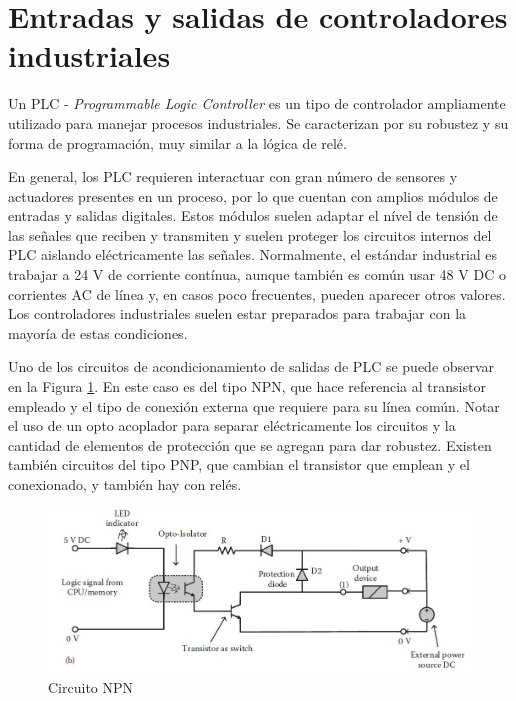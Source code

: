 \section{Entradas y salidas de controladores industriales}

Un PLC - \textit{Programmable Logic Controller} es un tipo de controlador ampliamente utilizado para manejar procesos industriales. Se caracterizan por su robustez y su forma de programación, muy similar a la lógica de relé.

En general, los PLC requieren interactuar con gran número de sensores y actuadores presentes en un proceso, por lo que cuentan con amplios módulos de entradas y salidas digitales. Estos módulos suelen adaptar el nível de tensión de las señales que reciben y transmiten y suelen proteger los circuitos internos del PLC aislando eléctricamente las señales\citep{Introduction_Industrial_Automation}. Normalmente, el estándar industrial es trabajar a 24 V de corriente contínua, aunque también es común usar 48 V DC o corrientes AC de línea y, en casos poco frecuentes, pueden aparecer otros valores. Los controladores industriales suelen estar preparados para trabajar con la mayoría de estas condiciones.

Uno de los circuitos de acondicionamiento de salidas de PLC se puede observar en la Figura \ref{fig:Circuito_NPN}. En este caso es del tipo NPN, que hace referencia al transistor empleado y el tipo de conexión externa que requiere para su línea común. Notar el uso de un opto acoplador para separar eléctricamente los circuitos y la cantidad de elementos de protección que se agregan para dar robustez. Existen también circuitos del tipo PNP, que cambian el transistor que emplean y el conexionado, y también hay con relés.

\begin{figure}[htbp]
	\centering
	\includegraphics[scale=.6]{./Figures/Circuito_NPN.JPG}
	\caption{Circuito NPN\citep{Introduction_Industrial_Automation}}
	\label{fig:Circuito_NPN}
\end{figure}

